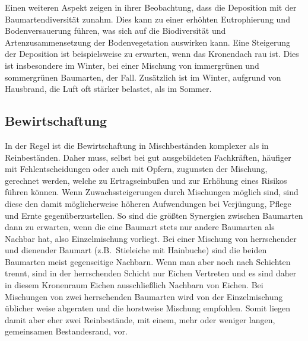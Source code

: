 \documentclass[twocolumn]{scrartcl}
\begin{document}
Einen weiteren Aspekt zeigen \cite{zhang2022MischwaldDeposition} in
ihrer Beobachtung, dass die Deposition mit der Baumartendiversität
zunahm. Dies kann zu einer erhöhten Eutrophierung und Bodenversauerung
führen, was sich auf die Biodiversität und Artenzusammensetzung der
Bodenvegetation auswirken kann. Eine Steigerung der Deposition ist beispielsweise zu erwarten, wenn das Kronendach rau ist. Dies ist insbesondere im Winter, bei einer Mischung von immergrünen und sommergrünen Baumarten, der Fall. Zusätzlich ist im Winter, aufgrund von Hausbrand, die Luft oft stärker belastet, als im Sommer.

\subsection{Bewirtschaftung}
\label{ssec:bewirtschaftung}

In der Regel ist die Bewirtschaftung in Mischbeständen komplexer als
in Reinbeständen. Daher muss, selbst bei gut ausgebildeten
Fachkräften, häufiger mit Fehlentscheidungen oder auch mit Opfern,
zugunsten der Mischung, gerechnet werden, welche zu Ertragseinbußen und
zur Erhöhung eines Risikos führen können. Wenn Zuwachssteigerungen
durch Mischungen möglich sind, sind diese den damit möglicherweise
höheren Aufwendungen bei Verjüngung, Pflege und Ernte
gegenüberzustellen. So sind die größten Synergien zwischen Baumarten
dann zu erwarten, wenn die eine Baumart stets nur andere Baumarten als
Nachbar hat, also Einzelmischung vorliegt. Bei einer Mischung von
herrschender und dienender Baumart (z.B.\ Stieleiche mit Hainbuche)
sind die beiden Baumarten meist gegenseitige Nachbarn. Wenn man aber noch nach Schichten trennt, sind in der herrschenden Schicht nur Eichen Vertreten und es sind daher in diesem Kronenraum Eichen ausschließlich Nachbarn von Eichen.
Bei Mischungen von zwei herrschenden Baumarten
wird von der Einzelmischung üblicher weise abgeraten und die
horstweise Mischung empfohlen. Somit liegen damit aber eher zwei
Reinbestände, mit einem, mehr oder weniger langen, gemeinsamen
Bestandesrand, vor.
\end{document}
